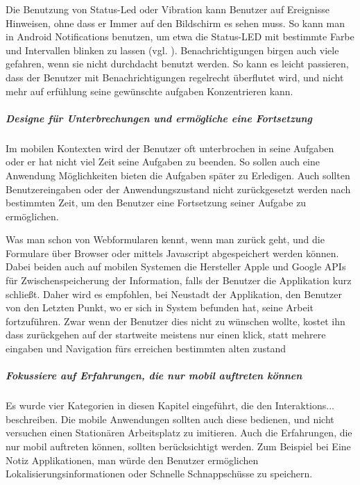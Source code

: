 Die Benutzung von Status-Led oder Vibration kann Benutzer auf Ereignisse Hinweisen, ohne dass er Immer auf den Bildschirm es sehen muss. So kann man in Android Notifications benutzen, um etwa die Status-LED mit bestimmte Farbe und Intervallen blinken zu lassen (vgl. \cite{androidNotApi}). Benachrichtigungen birgen auch viele gefahren, wenn sie nicht durchdacht benutzt werden. So kann es leicht passieren, dass der Benutzer mit Benachrichtigungen regelrecht überflutet wird, und nicht mehr auf erfühlung seine gewünschte aufgaben Konzentrieren kann.  

\subparagraph{Designe für Unterbrechungen und ermögliche eine Fortsetzung}
\label{subp:erm_gliche_eine_fortsetzung}

Im mobilen Kontexten wird der Benutzer oft unterbrochen in seine Aufgaben oder er hat nicht viel Zeit seine Aufgaben zu beenden. So sollen auch eine Anwendung Möglichkeiten bieten die Aufgaben später zu Erledigen. Auch sollten Benutzereingaben oder der Anwendungszustand nicht zurückgesetzt werden nach bestimmten Zeit, um den Benutzer eine Fortsetzung seiner Aufgabe zu ermöglichen.

Was man schon von Webformularen kennt, wenn man zurück geht, und die Formulare über Browser oder mittels Javascript abgespeichert werden können. 
Dabei beiden auch auf mobilen Systemen die Hersteller Apple und Google APIs für Zwischenspeicherung der Information, falls der Benutzer die Applikation kurz schließt.  Daher wird es empfohlen, bei Neustadt der Applikation, den Benutzer von den Letzten Punkt, wo er sich in System befunden hat, seine Arbeit fortzuführen. Zwar wenn der Benutzer dies nicht zu wünschen wollte, kostet ihn dass zurückgehen auf der startweite meistens nur einen klick, statt mehrere eingaben und Navigation fürs erreichen bestimmten alten zustand 



\subparagraph{Fokussiere auf Erfahrungen, die nur mobil auftreten können} %
\label{subp:fokussiere_auf_erfahrungen_die_nur_mobil_auftreten_k_nnen}

Es wurde vier Kategorien in diesen Kapitel eingeführt, die den Interaktions... beschreiben. Die mobile Anwendungen sollten auch diese bedienen, und nicht versuchen einen Stationären Arbeitsplatz zu imitieren. Auch die Erfahrungen, die nur mobil auftreten können, sollten berücksichtigt werden. Zum Beispiel bei Eine Notiz Applikationen, man würde den Benutzer ermöglichen Lokalisierungsinformationen oder Schnelle Schnappschüsse zu speichern. 


